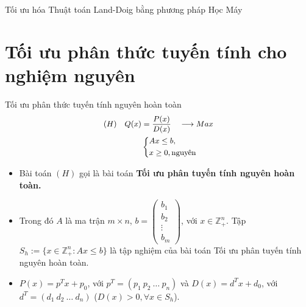 \documentclass[10pt]{beamer}
\begin{document}
\begin{frame}{Tối ưu hóa Thuật toán Land-Doig bằng phương pháp Học Máy}
    
    \bigskip

\end{frame}

\section*{Tối ưu phân thức tuyến tính cho nghiệm nguyên}







\begin{frame}{Tối ưu phân thức tuyến tính nguyên hoàn toàn}
\begin{equation} \small
    \begin{split}
    (H) \quad Q(x) & = \frac{P(x)}{D(x)} \quad \longrightarrow Max \\
        & \left\{
        \begin{split}
        &Ax \leq  b, \\
        &x \geq 0, \text{nguyên} \\
        \end{split}
        \right.    
    \end{split}
\end{equation}            
\begin{itemize} \small
\item Bài toán $(H)$ gọi là bài toán \textbf{Tối ưu phân tuyến tính nguyên hoàn toàn.}
\item Trong đó $A$ là ma trận $m\times n$, $b=\begin{pmatrix}
    b_1 \\
    b_2 \\
    \vdots \\
    b_m
    \end{pmatrix}$, với $x\in \mathbb{Z}^n_+$. Tập $S_h:=\{x\in \mathbb{Z}^n_+: Ax\leq b\}$ là tập nghiệm của bài toán Tối ưu phân tuyến tính nguyên hoàn toàn. 
\item $P(x)=p^Tx+p_0$, với $p^T = (p_1 \: p_2 \: \ldots \: p_n)$ và $D(x)=d^Tx+d_0$, với $d^T = (d_1 \: d_2 \: \ldots \: d_n)$ ($D(x)>0, \forall x \in S_h$).
\end{itemize}
\end{frame}
\end{document}
